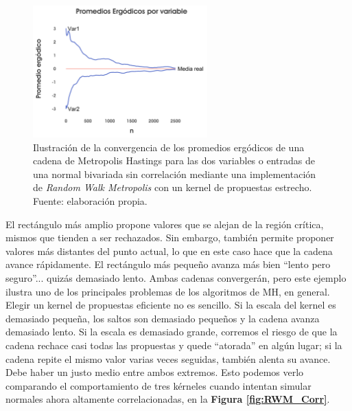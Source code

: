 \begin{figure}[H]
	\centering
	\includegraphics[width=0.6\textwidth]{Figs/Bayes/Ejemplo2_RWM_C}
        \caption{Ilustración de la convergencia de los promedios ergódicos de una cadena de Metropolis Hastings para las dos variables o entradas de una normal bivariada sin correlación mediante una implementación de \textit{Random Walk Metropolis} con un kernel de propuestas estrecho. Fuente: elaboración propia.}\label{fig:RWM2_ergo}
\end{figure}

El rectángulo más amplio propone valores que se alejan de la región crítica, mismos que tienden a ser rechazados. Sin embargo, también permite proponer valores más distantes del punto actual, lo que en este caso hace que la cadena avance rápidamente. El rectángulo más pequeño avanza más bien ``lento pero seguro''... quizás demasiado lento. Ambas cadenas convergerán, pero este ejemplo ilustra uno de los principales problemas de los algoritmos de MH, en general.\\ 

Elegir un kernel de propuestas eficiente no es sencillo. Si la escala del kernel es demasiado pequeña, los saltos son demasiado pequeños y la cadena avanza demasiado lento. Si la escala es demasiado grande, corremos el riesgo de que la cadena rechace casi todas las propuestas y quede ``atorada'' en algún lugar; si la cadena repite el mismo valor varias veces seguidas, también alenta su avance. Debe haber un justo medio entre ambos extremos. Esto podemos verlo comparando el comportamiento de tres kérneles cuando intentan simular normales ahora altamente correlacionadas, en la \textbf{Figura \ref{fig:RWM_Corr}}.\\ 

